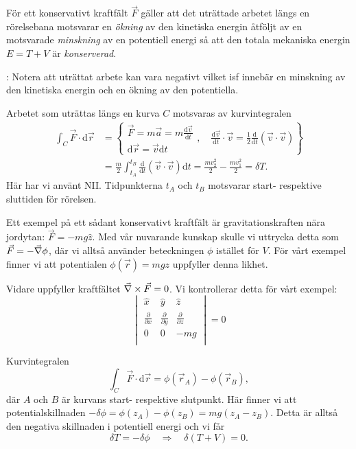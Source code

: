 \documentclass[%
oneside,                 %
final,                   %
10pt]{article}
\newcommand{\longinlinecomment}[3]{{\color{red}{\bf #1}: #2}}
\newenvironment{notice_mdfboxadmon}[1][]{
\begin{notice_mdfboxmdframed}[frametitle=#1]
}
{
\end{notice_mdfboxmdframed}
}
\begin{document}
\begin{notice_mdfboxadmon}

För ett konservativt kraftfält $\vec{F}$ gäller att det uträttade arbetet längs en rörelsebana motsvarar en \emph{ökning} av den kinetiska energin åtföljt av en motsvarade \emph{minskning} av en potentiell energi så att den totala mekaniska energin $E = T + V$ är \emph{konserverad}.

\longinlinecomment{Kommentar 1}{ Notera att uträttat arbete kan vara negativt vilket isf innebär en minskning av den kinetiska energin och en ökning av den potentiella. }{ Notera att uträttat arbete }

Arbetet som uträttas längs en kurva $C$ motsvaras av kurvintegralen
\begin{align}
\int_C \vec{F} \cdot \mbox{d}\vec{r} &= \left\{ \begin{array}{l}
\vec{F} = m \vec{a} = m \frac{\mbox{d}\vec{v}}{\mbox{d}t} \\
\mbox{d}\vec{r} = \vec{v} \mbox{d}t
\end{array} 
, \quad \frac{\mbox{d}\vec{v}}{\mbox{d}t} \cdot \vec{v} = \frac{1}{2}\frac{\mbox{d}}{\mbox{d}t} (\vec{v} \cdot \vec{v})
\right\} \\
&= \frac{m}{2} \int_{t_A}^{t_B} \frac{\mbox{d}}{\mbox{d}t} (\vec{v} \cdot \vec{v}) \mbox{d}t = \frac{m v_2^2}{2} - \frac{m v_1^2}{2} = \delta T.
\end{align}
Här har vi använt NII. Tidpunkterna $t_A$ och $t_B$ motsvarar start- respektive sluttiden för rörelsen.

Ett exempel på ett sådant konservativt kraftfält är gravitationskraften nära jordytan: $\vec{F} = - m g \hat{z}$.
Med vår nuvarande kunskap skulle vi uttrycka detta som $\vec{F} = -\vec{\nabla} \phi$, där vi alltså använder beteckningen $\phi$ istället för $V$. För vårt exempel finner vi att potentialen $\phi(\vec{r}) = m g z$ uppfyller denna likhet.

Vidare uppfyller kraftfältet $\vec{\nabla} \times \vec{F} = 0$. Vi kontrollerar detta för vårt exempel: 
$$
\begin{vmatrix}
\hat{x} & \hat{y} & \hat{z} \\
\frac{\partial}{\partial x} & \frac{\partial}{\partial y} & \frac{\partial}{\partial z} \\
\mbox{0}  &  \mbox{0}  & -mg \\
\end{vmatrix}
= 0
$$

Kurvintegralen
$$
\int_C \vec{F} \cdot \mbox{d}\vec{r} = \phi\left( \vec{r}_A \right) - \phi\left( \vec{r}_B \right),
$$
där $A$ och $B$ är kurvans start- respektive slutpunkt. Här finner vi att potentialskillnaden $-\delta \phi = \phi(z_A) - \phi(z_B) = mg (z_A-z_B)$. Detta är alltså den negativa skillnaden i potentiell energi och vi får
$$
\delta T = - \delta \phi \quad \Rightarrow \quad \delta(T+V) = 0.
$$
\end{notice_mdfboxadmon} %
\end{document}
